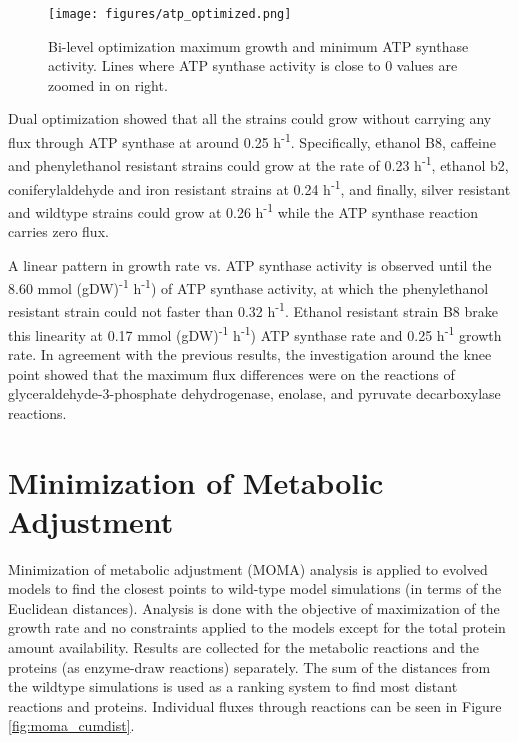\begin{figure}[H]
  \begin{center}
  \texttt{[image: figures/atp\_optimized.png]}
  \caption[Bi-level optimization maximum growth and minimum ATP synthase activity. Lines where ATP synthase activity is close to 0 values are zoomed in on right.]{Bi-level optimization maximum growth and minimum ATP synthase activity. Lines where ATP synthase activity is close to 0 values are zoomed in on right.}
  \label{fig:bi_level1}
  \end{center}
\end{figure}

Dual optimization showed that all the strains could grow without carrying any flux through ATP synthase at around 0.25 h\textsuperscript{-1}. Specifically, ethanol B8,
caffeine and phenylethanol resistant strains could grow at the rate of  0.23 h\textsuperscript{-1}, ethanol b2, coniferylaldehyde and iron resistant strains at 0.24 h\textsuperscript{-1}, and finally, silver resistant and wildtype strains could grow at  0.26 h\textsuperscript{-1} while the ATP synthase reaction carries zero flux.

A linear pattern in growth rate vs. ATP synthase activity is observed until the 8.60 mmol (gDW)\textsuperscript{-1} h\textsuperscript{-1}) of ATP synthase activity, at which the phenylethanol resistant strain could not faster than 0.32 h\textsuperscript{-1}. Ethanol resistant strain B8 brake this linearity at 0.17  mmol (gDW)\textsuperscript{-1} h\textsuperscript{-1}) ATP synthase rate and 0.25 h\textsuperscript{-1} growth rate. In agreement with the previous results, the investigation around the knee point showed that the maximum flux differences were on the reactions of glyceraldehyde-3-phosphate dehydrogenase, enolase, and pyruvate decarboxylase reactions.

\section{Minimization of Metabolic Adjustment}

Minimization of metabolic adjustment (MOMA) analysis is applied to evolved models to find the closest points to wild-type model simulations (in terms of the Euclidean distances). Analysis is done with the objective of maximization of the growth rate and no constraints applied to the models except for the total protein amount availability. Results are collected for the metabolic reactions and the proteins (as enzyme-draw reactions) separately. The sum of the distances from the wildtype simulations is used as a ranking system to find most distant reactions and proteins. Individual fluxes through reactions can be seen in Figure \ref{fig:moma_cumdist}.


